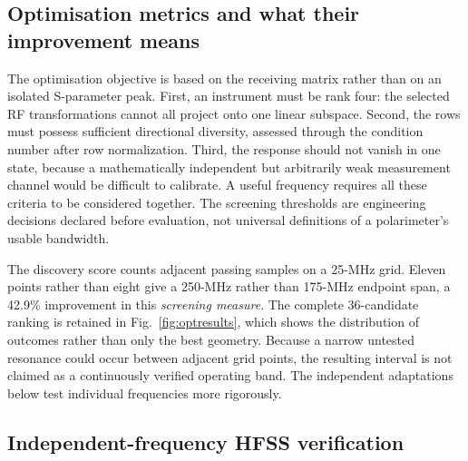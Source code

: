 \documentclass{ieeeaccess}
\begin{document}
\subsection{Optimisation metrics and what their improvement means}
The optimisation objective is based on the receiving matrix rather than on an isolated S-parameter peak. First, an instrument must be rank four: the selected RF transformations cannot all project onto one linear subspace. Second, the rows must possess sufficient directional diversity, assessed through the condition number after row normalization. Third, the response should not vanish in one state, because a mathematically independent but arbitrarily weak measurement channel would be difficult to calibrate. A useful frequency requires all these criteria to be considered together. The screening thresholds are engineering decisions declared before evaluation, not universal definitions of a polarimeter's usable bandwidth.

The discovery score counts adjacent passing samples on a 25-MHz grid. Eleven points rather than eight give a 250-MHz rather than 175-MHz endpoint span, a 42.9\% improvement in this \emph{screening measure}. The complete 36-candidate ranking is retained in Fig.~\ref{fig:optresults}, which shows the distribution of outcomes rather than only the best geometry. Because a narrow untested resonance could occur between adjacent grid points, the resulting interval is not claimed as a continuously verified operating band. The independent adaptations below test individual frequencies more rigorously.

\subsection{Independent-frequency HFSS verification}
\label{sec:conditioningexplained}
\end{document}
